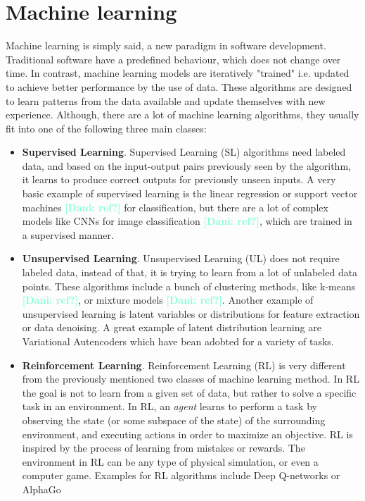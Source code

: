 \documentclass[12pt, a4paper,  nobibnotes]{article}
\newcommand{\nd}[1]{\textcolor{Aquamarine}{\textbf{[Dani: #1]}}}
\begin{document}
\section{Machine learning}
\label{sec:ml-intro}

Machine learning is simply said, a new paradigm in software development. Traditional software have
a predefined behaviour, which does not change over time. In contrast, machine learning models
are iteratively "trained" i.e. updated to achieve better performance by the use of data. These algorithms
are designed to learn patterns from the data available and update themselves with new experience.
Although, there are a lot of machine learning algorithms, they usually fit into one of the following three 
main classes:
\begin{itemize}
    \item \textbf{Supervised Learning}. Supervised Learning (SL) algorithms need labeled data, and
    based on the input-output pairs previously seen by the algorithm, it learns to produce
    correct outputs for previously unseen inputs. A very basic example of supervised learning 
    is the linear regression or support vector machines \nd{ref?} for classification, but there are a lot of complex models like CNNs for image classification
    \nd{ref?}, which are trained in a supervised manner.  
    \item \textbf{Unsupervised Learning}. Unsupervised Learning (UL) does not require labeled data, instead
    of that, it is trying to learn from a lot of unlabeled data points. These algorithms include a bunch
    of clustering methods, like k-means \nd{ref?}, or mixture models \nd{ref?}. Another example of unsupervised
    learning is latent variables or distributions for feature extraction or data denoising. A great example 
    of latent distribution learning are Variational Autencoders \cite{VAEPaper} which have bean adobted 
    for a variety of tasks.
    \item \textbf{Reinforcement Learning}. Reinforcement Learning (RL) is very different from the previously
    mentioned two classes of machine learning method. In RL the goal is not to learn from a given set of 
    data, but rather to solve a specific task in an environment. In RL, an \textit{agent} learns to 
    perform a task by observing the state (or some subspace of the state) of the surrounding environment,
    and executing actions in order to maximize an objective. RL is inspired by the process of learning from 
    mistakes or rewards. The environment in RL can be any type of physical simulation, or even a computer game.
    Examples for RL algorithms include Deep Q-networks \cite{RLAtariDQN} or AlphaGo \cite{Silver2016AlphaGo}
\end{itemize}
\end{document}
